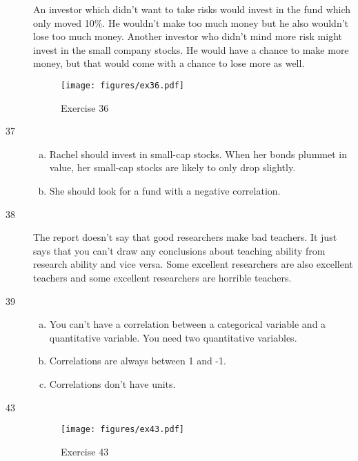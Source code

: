 \documentclass[letterpaper, landscape]{exam}
\begin{document}
\begin{description}
        An investor which didn't want to take risks would invest in the fund
        which only moved 10\%.  He wouldn't make too much money but he also
        wouldn't lose too much money.  Another investor who didn't mind more
        risk might invest in the small company stocks.  He would have a chance
        to make more money, but that would come with a chance to lose more as
        well.


        \begin{figure}[H]
          \centering
          \texttt{[image: figures/ex36.pdf]}
          \caption{Exercise 36}
        \end{figure}

      \newpage

      \item[37]
        \begin{enumerate}[(a)]
          \item Rachel should invest in small-cap stocks.  When her bonds
            plummet in value, her small-cap stocks are likely to only drop
            slightly.

          \item She should look for a fund with a negative correlation.
        \end{enumerate}

      \item[38]
        The report doesn't say that good researchers make bad teachers.  It just
        says that you can't draw any conclusions about teaching ability from
        research ability and vice versa.  Some excellent researchers are also
        excellent teachers and some excellent researchers are horrible teachers.

      \item[39]
        \begin{enumerate}[(a)]
          \item You can't have a correlation between a categorical variable and
            a quantitative variable.  You need two quantitative variables.

          \item Correlations are always between 1 and -1.

          \item Correlations don't have units.
        \end{enumerate}

      \item[43]
        \begin{figure}[H]
          \centering
          \texttt{[image: figures/ex43.pdf]}
          \caption{Exercise 43}
        \end{figure}


\end{description}
\end{document}
